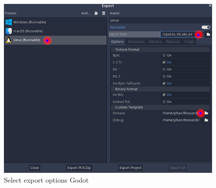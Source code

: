 \documentclass{sigplanconf}
\begin{document}
\begin{figure}[h]
  \caption{Select export options Godot}
  \includegraphics[width=\linewidth]{export_options.png}
\end{figure}

\end{document}
